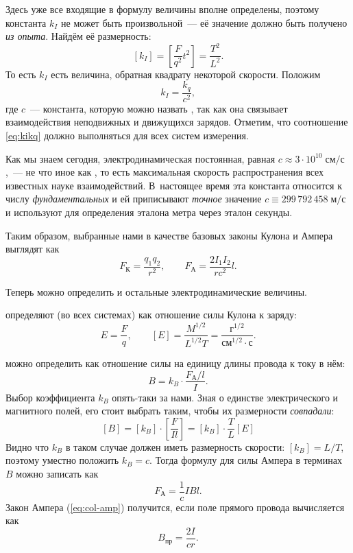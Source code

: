Здесь уже все входящие в формулу величины вполне определены,
поэтому константа $k_{I}$ не может быть произвольной~--- её значение
должно быть получено \emph{из опыта}. Найдём её размерность:
\[
\left[k_{I}\right]=\left[\frac{F}{q^{2}}t^{2}\right]=\frac{T^{2}}{L^{2}}.
\]
То есть $k_{I}$ есть величина, обратная квадрату некоторой скорости.
Положим
\begin{equation}
k_{I}=\frac{k_{q}}{c^{2}},\label{eq:kikq}
\end{equation}
где $c$~--- константа, которую можно назвать , так как она связывает взаимодействия неподвижных и движущихся
зарядов. Отметим, что соотношение \ref{eq:kikq} должно выполняться
для всех систем измерения.

Как мы знаем сегодня, электродинамическая постоянная,
равная $c\approx3\cdot10^{10}\;\text{см}/\text{с}$,~--- не что иное
как , то есть максимальная скорость
распространения всех известных науке взаимодействий. В~настоящее время
эта константа относится к числу \emph{фундаментальных} и ей приписывают
\emph{точное} значение $c\equiv299\,792\,458\;\text{м/с}$
и используют для определения эталона метра через эталон секунды.

Таким образом, выбранные нами в качестве базовых законы Кулона и Ампера
выглядят как
\begin{equation}
F_{\text{К}}=\frac{q_{1}q_{2}}{r^{2}},\qquad F_{\text{А}}=\frac{2I_{1}I_{2}}{rc^{2}}l.\label{eq:col-amp}
\end{equation}

Теперь можно определить и остальные электродинамические величины.

 определяют (во всех системах)
как отношение силы Кулона к заряду:
\[
E=\frac{F}{q},\qquad\left[E\right]=\frac{M^{1/2}}{L^{1/2}T}=\frac{\text{г}^{1/2}}{\text{см}^{1/2}\cdot\text{с}}.
\]

 можно определить как отношение силы
на единицу длины провода к току в нём:
\begin{equation}
B=k_{B}\cdot\frac{F_{\text{А}}/l}{I}.\label{eq:kB}
\end{equation}
Выбор коэффициента $k_{B}$ опять-таки за нами. Зная о единстве электрического
и магнитного полей, его стоит выбрать таким, чтобы их размерности
\emph{совпадали}:
\[
\left[B\right]=\left[k_{B}\right]\cdot\left[\frac{F}{Il}\right]=\left[k_{B}\right]\cdot\frac{T}{L}\left[E\right]
\]
Видно что $k_{B}$ в таком случае должен иметь размерность скорости:
$\left[k_{B}\right]=L/T$, поэтому уместно положить $k_{B}=c$. Тогда
формулу для силы Ампера в терминах $B$ можно записать как
\begin{equation}
F_{\text{А}}=\frac{1}{c}IBl.
\end{equation}
Закон Ампера (\ref{eq:col-amp}) получится, если поле прямого провода
вычисляется как
\[
B_{\text{пр}}=\dfrac{2I}{cr}.
\]

